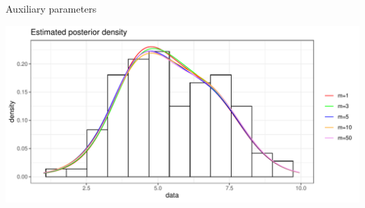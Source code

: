 \begin{frame}{Auxiliary parameters}

\begin{center}
		\includegraphics[scale=0.5]{etc/dens_withmM10.pdf}
	\end{center}
\end{frame}


